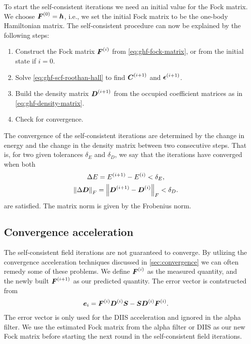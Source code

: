             To start the self-consistent iterations we need an initial value for
            the Fock matrix.
            We choose $\boldsymbol{F}^{(0)} = \boldsymbol{h}$, i.e., we set the initial
            Fock matrix to be the one-body Hamiltonian matrix.
            The self-consistent procedure can now be explained by the following
            steps:
            \begin{enumerate}
                \item Construct the Fock matrix $\boldsymbol{F}^{(i)}$ from
                    \autoref{eq:ghf-fock-matrix}, or from the initial state if
                    $i = 0$.
                \item Solve \autoref{eq:ghf-scf-roothan-hall} to find
                    $\boldsymbol{C}^{(i + 1)}$ and $\boldsymbol{\epsilon}^{(i + 1)}$.
                \item Build the density matrix $\boldsymbol{D}^{(i + 1)}$ from the
                    occupied coefficient matrices as in
                    \autoref{eq:ghf-density-matrix}.
                \item Check for convergence.
            \end{enumerate}
            The convergence of the self-consistent iterations are determined by
            the change in energy and the change in the density matrix between
            two consecutive steps.
            That is, for two given tolerances $\delta_E$ and $\delta_D$, we say
            that the iterations have converged when both
            \begin{gather}
                \Delta E
                = E^{(i + 1)} - E^{(i)} < \delta_E,
                \\
                \norm{\Delta \boldsymbol{D}}_{F}
                = \norm{\boldsymbol{D}^{(i + 1)} - \boldsymbol{D}^{(i)}}_{F}
                < \delta_D.
            \end{gather}
            are satisfied.
            The matrix norm is given by the Frobenius norm.

        \subsection{Convergence acceleration}
            The self-consistent field iterations are not guaranteed to converge.
            By utlizing the convergence acceleration techniques discussed in
            \autoref{sec:convergence} we can often remedy some of these
            problems.
            We define $\boldsymbol{F}^{(i)}$ as the measured quantity, and the newly
            built $\boldsymbol{F}^{(i + 1)}$ as our predicted quantity.
            The error vector is contstructed from
            \begin{align}
                \boldsymbol{e}_i
                = \boldsymbol{F}^{(i)} \boldsymbol{D}^{(i)} \boldsymbol{S}
                - \boldsymbol{S} \boldsymbol{D}^{(i)} \boldsymbol{F}^{(i)}.
            \end{align}
            The error vector is only used for the DIIS acceleration and ignored
            in the alpha filter.
            We use the estimated Fock matrix from the alpha filter or DIIS as
            our new Fock matrix before starting the next round in the
            self-consistent field iterations.


